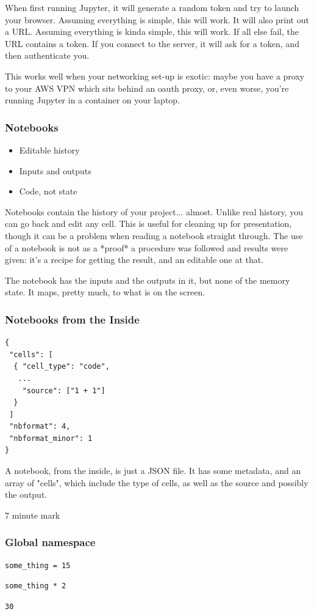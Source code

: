 When first running Jupyter,
it will generate a random token and try to launch your browser.
Assuming everything is simple, this will work.
It will also print out a URL.
Assuming everything is kinda simple, this will work.
If all else fail,
the URL contains a token.
If you connect to the server,
it will ask for a token,
and then authenticate you.

This works well when your networking set-up is exotic:
maybe you have a proxy to your AWS VPN which sits behind an oauth proxy,
or,
even worse,
you're running Jupyter in a container on your laptop.

\begin{frame}
\frametitle{Notebooks}

\begin{itemize}
\item Editable history
\item Inputs and outputs
\item Code, not state
\end{itemize}

\end{frame}

Notebooks contain the history of your project...
almost.
Unlike real history,
you can go back and edit any cell.
This is useful for cleaning up for presentation,
though it can be a problem when reading a notebook straight through.
The use of a notebook is not as a *proof* a procedure
was followed and results were given:
it's a recipe for getting the result,
and an editable one at that.

The notebook has the inputs and the outputs in it,
but none of the memory state.
It maps,
pretty much,
to what is on the screen.


\begin{frame}[fragile]
\frametitle{Notebooks from the Inside}

\begin{lstlisting}
{
 "cells": [
  { "cell_type": "code",
   ...
    "source": ["1 + 1"]
  }
 ]
 "nbformat": 4,
 "nbformat_minor": 1
}
\end{lstlisting}

\end{frame}

A notebook,
from the inside,
is just a JSON file.
It has some metadata,
and an array of "cells",
which include the type of cells,
as well as the source
and possibly the output.

7 minute mark

\begin{frame}[fragile]
\frametitle{Global namespace}

\begin{lstlisting}[frame=single]
some_thing = 15
\end{lstlisting}

\begin{lstlisting}[frame=single]
some_thing * 2
\end{lstlisting}

\begin{lstlisting}[frame=single]
30
\end{lstlisting}

\end{frame}

